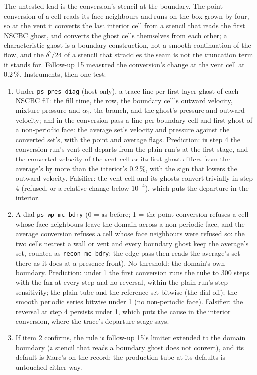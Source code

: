 \documentclass[11pt,a4paper]{article}
\newcommand{\code}[1]{\texttt{\small #1}}
\begin{document}
The untested lead is the conversion's stencil at the boundary.  The
point conversion of a cell reads its face neighbours and runs on the
box grown by four, so at the vent it converts the last interior cell
from a stencil that reads the first NSCBC ghost, and converts the ghost
cells themselves from each other; a characteristic ghost is a boundary
construction, not a smooth continuation of the flow, and the
$\delta^2/24$ of a stencil that straddles the seam is not the
truncation term it stands for.  Follow-up 15 measured the conversion's
change at the vent cell at 0.2\,\%.  Instruments, then one test:
\begin{enumerate}[nosep]
\item Under \code{ps\_pres\_diag} (host only), a trace line per
      first-layer ghost of each NSCBC fill: the fill time, the row, the
      boundary cell's outward velocity, mixture pressure and $\alpha_1$,
      the branch, and the ghost's pressure and outward velocity; and in
      the conversion pass a line per boundary cell and first ghost of a
      non-periodic face: the average set's velocity and pressure against
      the converted set's, with the point and average flags.
      Prediction: in step 4 the conversion run's vent cell departs from
      the plain run's at the first stage, and the converted velocity of
      the vent cell or its first ghost differs from the average's by
      more than the interior's 0.2\,\%, with the sign that lowers the
      outward velocity.  Falsifier: the vent cell and its ghosts
      convert trivially in step 4 (refused, or a relative change below
      $10^{-4}$), which puts the departure in the interior.
\item A dial \code{ps\_wp\_mc\_bdry} (0 = as before; 1 = the point
      conversion refuses a cell whose face neighbours leave the domain
      across a non-periodic face, and the average conversion refuses a
      cell whose face neighbours were refused so: the two cells nearest
      a wall or vent and every boundary ghost keep the average's set,
      counted as \code{recon\_mc\_bdry}; the edge pass then reads the
      average's set there as it does at a presence front).  No threshold:
      the domain's own boundary.  Prediction: under 1 the first
      conversion runs the tube to 300 steps with the fan at every step
      and no reversal, within the plain run's step sensitivity; the plain
      tube and the reference set bitwise (the dial off); the smooth
      periodic series bitwise under 1 (no non-periodic face).  Falsifier:
      the reversal at step 4 persists under 1, which puts the cause in
      the interior conversion, where the trace's departure stage says.
\item If item 2 confirms, the rule is follow-up 15's limiter extended to
      the domain boundary (a stencil that reads a boundary ghost does
      not convert), and its default is Marc's on the record; the
      production tube at its defaults is untouched either way.
\end{enumerate}
\end{document}
